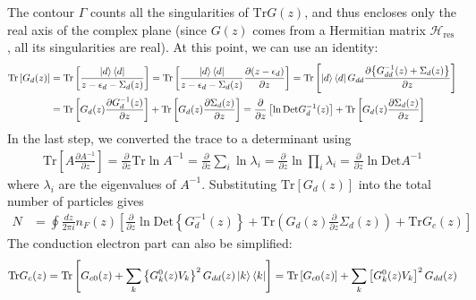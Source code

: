 \documentclass{report}
\numberwithin{equation}{section}
\begin{document}
The contour \(\Gamma\) counts all the singularities of \(\text{Tr} G(z)\), and thus encloses only the real axis of the complex plane (since \(G(z)\) comes from a Hermitian matrix \(\mathcal{H}_\text{res}\), all its singularities are real).
At this point, we can use an identity:
\begin{equation}\begin{aligned}
	\text{Tr}\left[G_{d}(z)\right] &= \text{Tr}\left[ \frac{\ket{d}\bra{d}}{z - \epsilon_d - \Sigma_d(z)}\right] = \text{Tr}\left[ \frac{\ket{d}\bra{d}}{z - \epsilon_d - \Sigma_d(z)}\frac{\partial{\left(z - \epsilon_d\right)}}{\partial{z}} \right] = \text{Tr}\left[ \ket{d}\bra{d}G_{dd}\frac{\partial{\left\{G_{dd}^{-1}(z) + \Sigma_d(z)\right\}}}{\partial{z}} \right]\\
				       &= \text{Tr}\left[ G_{d}(z)\frac{\partial{G_{d}^{-1}(z)}}{\partial{z}} \right] + \text{Tr}\left[ G_{d}(z)\frac{\partial{\Sigma_d(z)}}{\partial{z}} \right] = \frac{\partial{}}{\partial{z}}\left[\ln \text{Det}G_{d}^{-1}(z)\right] + \text{Tr}\left[ G_{d}(z)\frac{\partial{\Sigma_d(z)}}{\partial{z}} \right]\\
\end{aligned}\end{equation}
In the last step, we converted the trace to a determinant using
\begin{equation}\begin{aligned}
	\text{Tr}\left[A \frac{\partial{A^{-1}}}{\partial{z}}\right] = \frac{\partial{}}{\partial{z}}\text{Tr}\ln A^{-1} =\frac{\partial{}}{\partial{z}}\sum_i \ln \lambda_i = \frac{\partial{}}{\partial{z}}\ln \prod_i \lambda_i = \frac{\partial{}}{\partial{z}}\ln \text{Det}A^{-1}
\end{aligned}\end{equation}
where \(\lambda_i\) are the eigenvalues of \(A^{-1}\). Substituting \(\text{Tr}\left[G_d(z)\right] \) into the total number of particles gives
\begin{equation}\begin{aligned}
	N  &= \oint \frac{dz}{2\pi i}n_F(z) \left[\frac{\partial{}}{\partial{z}} \ln \text{Det} \left\{G^{-1}_d(z)\right\} + \text{Tr} \left( G_d(z) \frac{\partial{}}{\partial{z}}\Sigma_d(z) \right) + \text{Tr}G_c(z)\right]
\end{aligned}\end{equation}
The conduction electron part can also be simplified:
\begin{equation}\begin{aligned}
	\text{Tr}G_c(z) &= \text{Tr}\left[G_{c0}(z) + \sum_k \left\{G_k^0(z)V_k\right\}^2 G_{dd}(z)\ket{k}\bra{k}\right] =\text{Tr}\left[G_{c0}(z)\right] + \sum_k\left[G_k^0(z)V_k\right]^2 G_{dd}(z)\\
\end{aligned}\end{equation}
\end{document}
